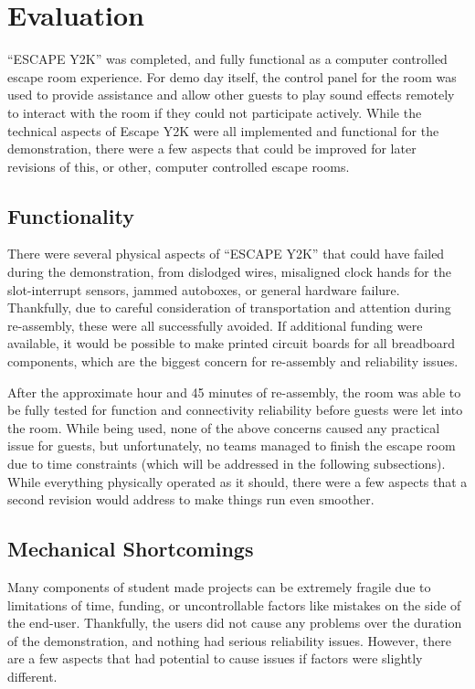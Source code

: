 \documentclass[conference]{IEEEtran}
\begin{document}
\section{Evaluation} %
``ESCAPE Y2K'' was completed, and fully functional as a computer controlled escape room experience. For demo day itself, 
the control panel for the room was used to provide assistance and allow other guests to play sound effects remotely to 
interact with the room if they could not participate actively. While the technical aspects of Escape Y2K were all 
implemented and functional for the demonstration, there were a few aspects that could be improved for later revisions 
of this, or other, computer controlled escape rooms.

\subsection{Functionality}
There were several physical aspects of ``ESCAPE Y2K'' that could have failed during the demonstration, from dislodged wires, 
misaligned clock hands for the slot-interrupt sensors, jammed autoboxes, or general hardware failure. Thankfully, due 
to careful consideration of transportation and attention during re-assembly, these were all successfully avoided. If 
additional funding were available, it would be possible to make printed circuit boards for all breadboard components, 
which are the biggest concern for re-assembly and reliability issues.

\indent After the approximate hour and 45 minutes of re-assembly, the room was able to be fully tested for function 
and connectivity reliability before guests were let into the room. While being used, none of the above concerns caused 
any practical issue for guests, but unfortunately, no teams managed to finish the escape room due to time constraints 
(which will be addressed in the following subsections). While everything physically operated as it should, there were a 
few aspects that a second revision would address to make things run even smoother.

\subsection{Mechanical Shortcomings}
Many components of student made projects can be extremely fragile due to limitations of time, funding, or uncontrollable 
factors like mistakes on the side of the end-user. Thankfully, the users did not cause any problems over the duration of 
the demonstration, and nothing had serious reliability issues. However, there are a few aspects that had potential to cause 
issues if factors were slightly different.
\end{document}
